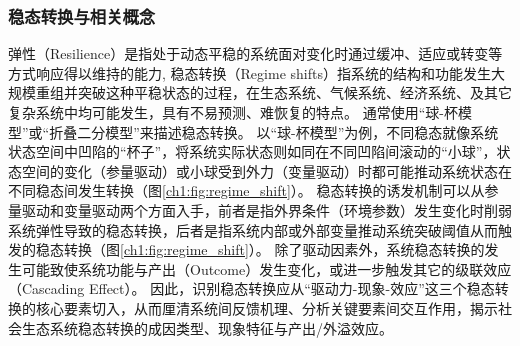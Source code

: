 
\subsubsection{稳态转换与相关概念}

弹性（Resilience）是指处于动态平稳的系统面对变化时通过缓冲、适应或转变等方式响应得以维持的能力\cite{folke2010}, 稳态转换（Regime shifts）指系统的结构和功能发生大规模重组并突破这种平稳状态的过程\cite{scheffer2001}，在生态系统、气候系统、经济系统、及其它复杂系统中均可能发生，具有不易预测、难恢复的特点\cite{scheffer2003, biggs2009}。
通常使用“球-杯模型”或“折叠二分模型”来描述稳态转换。
以“球-杯模型”为例，不同稳态就像系统状态空间中凹陷的“杯子”，将系统实际状态则如同在不同凹陷间滚动的“小球”，状态空间的变化（参量驱动）或小球受到外力（变量驱动）时都可能推动系统状态在不同稳态间发生转换\cite{scheffer2009, folke2010}（图\ref{ch1:fig:regime_shift}）。
稳态转换的诱发机制可以从参量驱动和变量驱动两个方面入手，前者是指外界条件（环境参数）发生变化时削弱系统弹性导致的稳态转换，后者是指系统内部或外部变量推动系统突破阈值从而触发的稳态转换\cite{scheffer2009, folke2010}（图\ref{ch1:fig:regime_shift}）。
除了驱动因素外，系统稳态转换的发生可能致使系统功能与产出（Outcome）发生变化，或进一步触发其它的级联效应（Cascading Effect）\cite{rocha2018}。
因此，识别稳态转换应从“驱动力-现象-效应”这三个稳态转换的核心要素切入，从而厘清系统间反馈机理、分析关键要素间交互作用，揭示社会\textendash{}生态系统稳态转换的成因类型、现象特征与产出/外溢效应。

